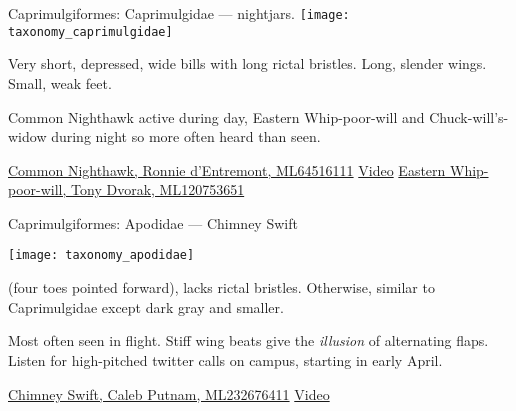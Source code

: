 \documentclass[t]{beamer}
\begin{document}
\begin{frame}[t]{Caprimulgiformes: Caprimulgidae — nightjars.}
\texttt{[image: taxonomy\_caprimulgidae]}

\hangpara Very short, depressed, wide bills with long rictal bristles. Long, slender wings. Small, weak feet.

\hangpara Common Nighthawk active during day, Eastern Whip-poor-will and Chuck-will's-widow during night so more often heard than seen.

\vfilll

\tiny \href{https://macaulaylibrary.org/asset/64516111}{Common Nighthawk, Ronnie d'Entremont, ML64516111} \hfill \href{https://www.allaboutbirds.org/guide/Common_Nighthawk/photo-gallery/466538}{Video} \hfill \href{https://macaulaylibrary.org/asset/120753651}{Eastern Whip-poor-will, Tony Dvorak, ML120753651}
\end{frame}

\begin{frame}[t]{Caprimulgiformes: Apodidae — Chimney Swift}

\vspace{-\baselineskip}

\begin{multicols}{2}
\texttt{[image: taxonomy\_apodidae]}

\columnbreak

 (four toes pointed forward), lacks rictal bristles. Otherwise, similar to Caprimulgidae except dark gray and smaller. 

\vspace{\baselineskip}

Most often seen in flight. Stiff wing beats give the \textit{illusion} of alternating flaps. Listen for high-pitched twitter calls on campus, starting in early April.
\end{multicols}

\vfilll

\tiny \href{https://macaulaylibrary.org/asset/232676411}{Chimney Swift, Caleb Putnam, ML232676411} \qquad  \href{https://www.allaboutbirds.org/guide/Chimney_Swift/photo-gallery/440546}{Video}

\end{frame}
\end{document}
